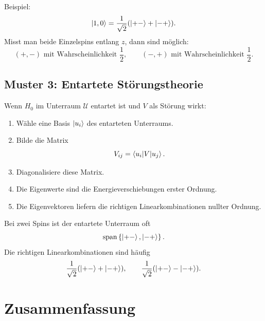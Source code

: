 Beispiel:
\[
    \left|1,0\right\rangle=\frac{1}{\sqrt2}(\left|+-\right\rangle+\left|-+\right\rangle).
\]
Misst man beide Einzelspins entlang \(z\), dann sind möglich:
\[
    (+,-) \text{ mit Wahrscheinlichkeit } \frac12,
    \qquad
    (-,+) \text{ mit Wahrscheinlichkeit } \frac12.
\]

\subsection{Muster 3: Entartete Störungstheorie}

Wenn \(H_0\) im Unterraum \(\mathcal U\) entartet ist und \(V\) als Störung wirkt:
\begin{enumerate}
    \item Wähle eine Basis \(\left|u_i\right\rangle\) des entarteten Unterraums.
    \item Bilde die Matrix
    \[
        V_{ij}=\left\langle u_i\middle|V\middle|u_j\right\rangle.
    \]
    \item Diagonalisiere diese Matrix.
    \item Die Eigenwerte sind die Energieverschiebungen erster Ordnung.
    \item Die Eigenvektoren liefern die richtigen Linearkombinationen nullter Ordnung.
\end{enumerate}

Bei zwei Spins ist der entartete Unterraum oft
\[
    \operatorname{span}\left\{ \left|+-\right\rangle,\left|-+\right\rangle \right\}.
\]
Die richtigen Linearkombinationen sind häufig
\[
    \frac{1}{\sqrt2}(\left|+-\right\rangle+\left|-+\right\rangle),
    \qquad
    \frac{1}{\sqrt2}(\left|+-\right\rangle-\left|-+\right\rangle).
\]

\section{Zusammenfassung}

